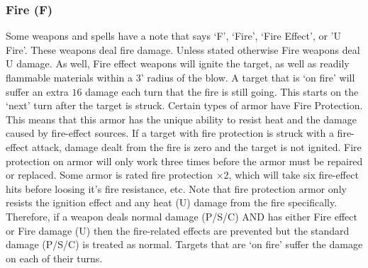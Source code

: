 \documentclass[twoside]{book}
\begin{document}
\subsubsection{Fire (F)}
     Some weapons and spells have a note that says
                 `F', `Fire', `Fire
                 Effect', or 'U Fire'. These weapons
                 deal fire damage. Unless stated otherwise Fire weapons
                 deal U damage. As well, Fire effect weapons will ignite
                 the target, as well as readily flammable materials
                 within a 3' radius of the blow. A target that is
                 `on fire' will suffer an extra \ensuremath{1}\ensuremath{6}\textscbf{} damage
                 each turn that the fire is still going. This starts on
                 the `next' turn after the target is struck.
                 Certain types of armor have Fire Protection. This means
                 that this armor has the unique ability to resist heat
                 and the damage caused by fire-effect sources. If a
                 target with fire protection is struck with a fire-effect
                 attack, damage dealt from the fire is zero and the
                 target is not ignited. Fire protection on armor will
                 only work three times before the armor must be repaired
                 or replaced. Some armor is rated fire protection
                 \ensuremath{\times}2, which will take six fire-effect hits before
                 loosing it's fire resistance, etc. Note that fire
                 protection armor only resists the ignition effect and
                 any heat (U) damage from the fire specifically.
                 Therefore, if a weapon deals normal damage (P/S/C) AND
                 has either Fire effect or Fire damage (U) then the
                 fire-related effects are prevented but the standard
                 damage (P/S/C) is treated as normal. Targets that are
                 `on fire' suffer the damage on each of their
                 turns. 
  

  
\end{document}
